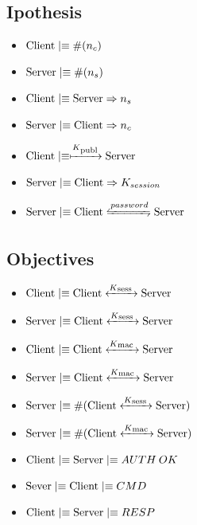 \subsection{Ipothesis}
\begin{itemize}
\item \(\textnormal{Client} \mid\equiv \#(n_c)\)
\item \(\textnormal{Server} \mid\equiv \#(n_s)\)
\item \(\textnormal{Client} \mid\equiv \textnormal{Server} \Rightarrow n_s\)
\item \(\textnormal{Server} \mid\equiv \textnormal{Client} \Rightarrow n_c\)
\item \(\textnormal{Client} \mid\equiv \xmapsto{K\textsubscript{publ}} \textnormal{Server}\)
\item \(\textnormal{Server} \mid\equiv \textnormal{Client} \Rightarrow K_{session}\)
\item \(\textnormal{Server} \believes \textnormal{Client} \secret{password} \textnormal{Server}\)
\end{itemize}

\subsection{Objectives}
\begin{itemize}
\item \(\textnormal{Client} \mid\equiv \textnormal{Client} \xleftrightarrow{K\textsubscript{sess }} \textnormal{Server}\)
\item \(\textnormal{Server} \mid\equiv \textnormal{Client} \xleftrightarrow{K\textsubscript{sess }} \textnormal{Server}\)
\item \(\textnormal{Client} \mid\equiv \textnormal{Client} \xleftrightarrow{K\textsubscript{mac }} \textnormal{Server}\)
\item \(\textnormal{Server} \mid\equiv \textnormal{Client} \xleftrightarrow{K\textsubscript{mac }} \textnormal{Server}\)
\item \(\textnormal{Server} \mid\equiv \#(\textnormal{Client} \xleftrightarrow{K\textsubscript{sess }} \textnormal{Server})\)
\item \(\textnormal{Server} \mid\equiv \#(\textnormal{Client} \xleftrightarrow{K\textsubscript{mac }} \textnormal{Server})\)
\item \(\textnormal{Client} \mid\equiv \textnormal{Server}\mid\equiv AUTH\:OK\)
\item \(\textnormal{Sever} \mid\equiv \textnormal{Client}\mid\equiv CMD\)
\item \(\textnormal{Client} \mid\equiv \textnormal{Server}\mid\equiv RESP\)
\end{itemize}

